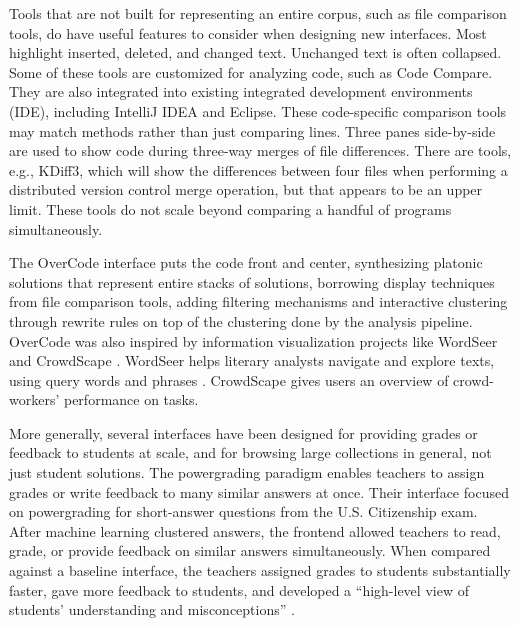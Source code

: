 Tools that are not built for representing an entire corpus, such as file comparison tools, do have useful features to consider when designing new interfaces. Most highlight inserted, deleted, and changed text. Unchanged text is often collapsed. Some of these tools are customized for analyzing code, such as Code Compare. They are also integrated into existing integrated development environments (IDE), including IntelliJ IDEA and Eclipse. These code-specific comparison tools may match methods rather than just comparing lines. Three panes side-by-side are used to show code during three-way merges of file differences. There are tools, e.g., KDiff3, which will show the differences between four files when performing a distributed version control merge operation, but that appears to be an upper limit. These tools do not scale beyond comparing a handful of programs simultaneously.

The OverCode interface puts the code front and center, synthesizing platonic solutions that represent entire stacks of solutions, borrowing display techniques from file comparison tools, adding filtering mechanisms and interactive clustering through rewrite rules on top of the clustering done by the analysis pipeline. OverCode was also inspired by information visualization projects like WordSeer \cite{wordseerlitcomp13,wordseercikm13} and CrowdScape \cite{crowdscape}. WordSeer helps literary analysts navigate and explore texts, using query words and phrases \cite{wordseerhcir11}. CrowdScape gives users an overview of crowd-workers’ performance on tasks.

More generally, several interfaces have been designed for providing grades or feedback to students at scale, and for browsing large collections in general, not just student solutions. The powergrading paradigm \cite{basupowergrading} enables teachers to assign grades or write feedback to many similar answers at once. Their interface focused on powergrading for short-answer questions from the U.S. Citizenship exam. After machine learning clustered answers, the frontend allowed teachers to read, grade, or provide feedback on similar answers simultaneously. When compared against a baseline interface, the teachers assigned grades to students substantially faster, gave more feedback to students, and developed a ``high-level view of students' understanding and misconceptions'' \cite{basuDivideAndConquer}.




